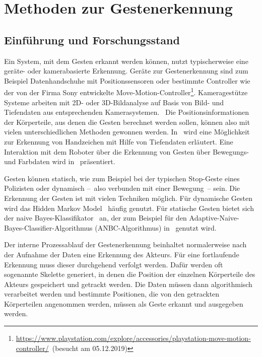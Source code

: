 \chapter{Methoden zur Gestenerkennung} \label{Gestenerkennungskapitel}

\section{Einführung und Forschungsstand}
Ein System, mit dem Gesten erkannt werden können, nutzt typischerweise eine geräte- oder kamerabasierte Erkennung. Geräte zur Gestenerkennung sind zum Beispiel Datenhandschuhe mit Positionssensoren oder bestimmte Controller wie der von der Firma Sony entwickelte Move-Motion-Controller\footnote{\url{https://www.playstation.com/explore/accessories/playstation-move-motion-controller/}~(besucht am 05.12.2019)}. Kameragestütze Systeme arbeiten mit 2D- oder 3D-Bildanalyse auf Basis von Bild- und Tiefendaten aus entsprechenden Kamerasystemen.~\cite{recognitionSurvey} Die Positionsinformationen der Körperteile, aus denen die Gesten berechnet werden sollen, können also mit vielen unterschiedlichen Methoden gewonnen werden. In~\cite{depthRecognition} wird eine Möglichkeit zur Erkennung von Handzeichen mit Hilfe von Tiefendaten erläutert. Eine Interaktion mit dem Roboter über die Erkennung von Gesten über Bewegungs- und Farbdaten wird in~\cite{colorRecognition} präsentiert.

Gesten können statisch, wie zum Beispiel bei der typischen Stop-Geste eines Polizisten oder dynamisch --~also verbunden mit einer Bewegung~-- sein. Die Erkennung der Gesten ist mit vielen Techniken möglich. Für dynamische Gesten wird das Hidden Markov Model~\cite{hiddenMarkov} häufig genutzt. Für statische Gesten bietet sich der naive Bayes-Klassifikator~\cite{patternClassification1} an, der zum Beispiel für den Adaptive-Naive-Bayes-Classifier-Algorithmus (ANBC-Algorithmus) in~\cite{gillianANBC} genutzt wird.

Der interne Prozessablauf der Gestenerkennung beinhaltet normalerweise nach der Aufnahme der Daten eine Erkennung des Akteurs. Für eine fortlaufende Erkennung muss dieser durchgehend verfolgt werden. Dafür werden oft sogenannte Skelette generiert, in denen die Position der einzelnen Körperteile des Akteurs gespeichert und getrackt werden. Die Daten müssen dann algorithmisch verarbeitet werden und bestimmte Positionen, die von den getrackten Körperteilen angenommen werden, müssen als Geste erkannt und ausgegeben werden.\cite{hannaKinect3}

